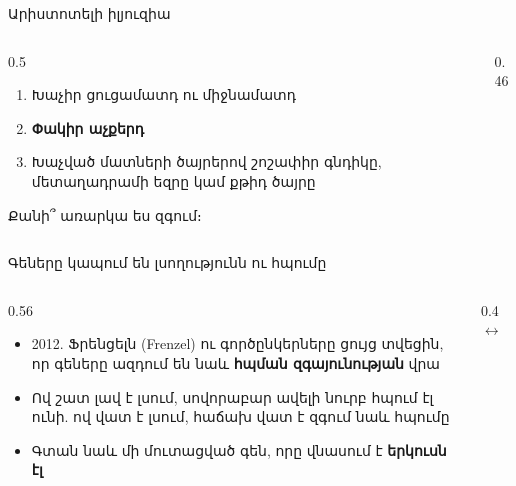 \begin{frame}{Արիստոտելի իլյուզիա}
  \begin{columns}[c]
    \begin{column}{0.5\textwidth}
      \begin{tryit}
        \begin{enumerate}
          \item Խաչիր ցուցամատդ ու միջնամատդ
          \item \textbf{Փակիր աչքերդ}
          \item Խաչված մատների ծայրերով շոշափիր գնդիկը, մետաղադրամի եզրը կամ քթիդ ծայրը
        \end{enumerate}
        Քանի՞ առարկա ես զգում։
      \end{tryit}
    \end{column}
    \begin{column}{0.46\textwidth}
      \centering
      \par
    \end{column}
  \end{columns}
\end{frame}

\begin{frame}{Գեները կապում են լսողությունն ու հպումը}
  \begin{columns}[c]
    \begin{column}{0.56\textwidth}
      \begin{itemize}
        \item 2012. Ֆրենցելն (Frenzel) ու գործընկերները ցույց տվեցին, որ գեները ազդում են նաև \textbf{հպման զգայունության} վրա
        \item<2-> Ով շատ լավ է լսում, սովորաբար ավելի նուրբ հպում էլ ունի. ով վատ է լսում, հաճախ վատ է զգում նաև հպումը
        \item<3-> Գտան նաև մի մուտացված գեն, որը վնասում է \textbf{երկուսն էլ}
      \end{itemize}
    \end{column}
    \begin{column}{0.4\textwidth}
      \centering
      \ {\Large $\leftrightarrow$}\ \par\medskip
    \end{column}
  \end{columns}
\end{frame}

